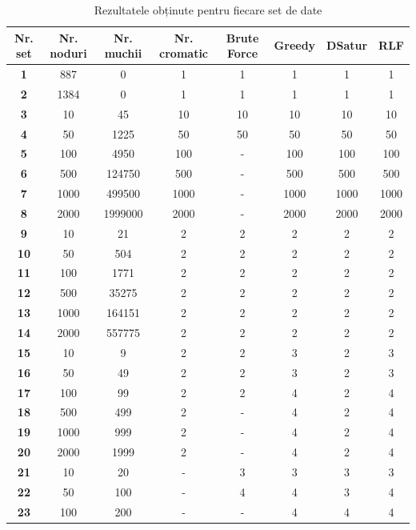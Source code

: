 \documentclass[runningheads]{llncs}
\begin{document}
\begin{table}[!]
\centering
\caption{Rezultatele obținute pentru fiecare set de date}
\label{tab:results}
\begin{tabular}{|c|c|c|c|c|c|c|c|}
\hline
\textbf{Nr. set} & \textbf{Nr. noduri} & \textbf{Nr. muchii} & \textbf{Nr. cromatic} & \textbf{Brute Force} & \textbf{Greedy} & \textbf{DSatur} & \textbf{RLF} \\ \hline
\textbf{1} & 887 & 0 & 1 & 1 & 1 & 1 & 1 \\ \hline 
\textbf{2} & 1384 & 0 & 1 & 1 & 1 & 1 & 1 \\ \hline
\textbf{3} & 10 & 45 & 10 & 10 & 10 & 10 & 10 \\ \hline 
\textbf{4} & 50 & 1225 & 50 & 50 & 50 & 50 & 50 \\ \hline 
\textbf{5} & 100 & 4950 & 100 & - & 100 & 100 & 100 \\ \hline 
\textbf{6} & 500 & 124750 & 500 & - & 500 & 500 & 500 \\ \hline 
\textbf{7} & 1000 & 499500 & 1000 & - & 1000 & 1000 & 1000 \\ \hline 
\textbf{8} & 2000 & 1999000 & 2000 & - & 2000 & 2000 & 2000 \\ \hline 
\textbf{9} & 10 & 21 & 2 & 2 & 2 & 2 & 2 \\ \hline 
\textbf{10} & 50 & 504 & 2 & 2 & 2 & 2 & 2 \\ \hline 
\textbf{11} & 100 & 1771 & 2 & 2 & 2 & 2 & 2 \\ \hline 
\textbf{12} & 500 & 35275 & 2 & 2 & 2 & 2 & 2 \\ \hline 
\textbf{13} & 1000 & 164151 & 2 & 2 & 2 & 2 & 2 \\ \hline 
\textbf{14} & 2000 & 557775 & 2 & 2 & 2 & 2 & 2 \\ \hline 
\textbf{15} & 10 & 9 & 2 & 2 & 3 & 2 & 3 \\ \hline 
\textbf{16} & 50 & 49 & 2 & 2 & 3 & 2 & 3 \\ \hline 
\textbf{17} & 100 & 99 & 2 & 2 & 4 & 2 & 4 \\ \hline 
\textbf{18} & 500 & 499 & 2 & - & 4 & 2 & 4 \\ \hline 
\textbf{19} & 1000 & 999 & 2 & - & 4 & 2 & 4 \\ \hline 
\textbf{20} & 2000 & 1999 & 2 & - & 4 & 2 & 4 \\ \hline 
\textbf{21} & 10 & 20 & - & 3 & 3 & 3 & 3 \\ \hline 
\textbf{22} & 50 & 100 & - & 4 & 4 & 3 & 4 \\ \hline 
\textbf{23} & 100 & 200 & - & - & 4 & 4 & 4 \\ \hline 

\end{tabular}
\end{table}
\end{document}
